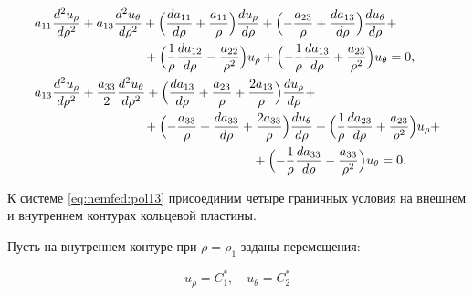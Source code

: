 \begin{equation}

\label{eq:nemfed:pol13}

\begin{aligned}

&a_{11}\dfrac{d^2 u_\rho}{d \rho^2}+a_{13}\dfrac{d^2 u_{\theta}}{d

\rho^2}+\Bigl(\dfrac{d a_{11}}{d \rho}+\dfrac{a_{11}}{\rho} \Bigr)\dfrac{du_{\rho}}{d \rho}+

\Bigl(-\dfrac{a_{23}}{\rho}+\dfrac{d a_{13}}{d\rho} \Bigr)\dfrac{du_\theta}{d \rho}+\\

& \hspace{3cm} +\Bigl(\dfrac{1}{\rho}\dfrac{d a_{12}}{d \rho} -\dfrac{ a_{22}}{\rho^2}\Bigr)u_{\rho}+ \Bigl(-\dfrac{1}{\rho}\dfrac{d a_{13}}{d \rho} +\dfrac{a_{23}}{\rho^2} \Bigr)u_\theta=0,\\

&a_{13}\dfrac{d^2 u_\rho}{d \rho^2}+\dfrac{a_{33}}{2}\dfrac{d^2

u_{\theta}}{d \rho^2}+\Bigl(\dfrac{d a_{13}}{d\rho}+ \dfrac{

a_{23}}{\rho}+\dfrac{2a_{13}}{\rho} \Bigr)\dfrac{du_{\rho}}{d

\rho}+ \\

& \hspace{3cm} +\Bigl(-\dfrac{a_{33}}{\rho}+\dfrac{d

a_{33}}{d\rho}+\dfrac{2a_{33}}{\rho} \Bigr) \dfrac{du_\theta}{d

\rho}+ \Bigl(\dfrac{1}{\rho}\dfrac{d a_{23}}{d\rho}+ \dfrac{

a_{23}}{\rho^2} \Bigr)u_\rho +\\

& \hspace{6cm} +\Bigl(-\dfrac{1}{\rho} \dfrac{d

a_{33}}{d\rho}-\dfrac{a_{33}}{\rho^2} \Bigr)u_\theta=0.

\end{aligned}

\end{equation}

 К системе \eqref{eq:nemfed:pol13} присоединим четыре граничных условия на внешнем и внутреннем контурах кольцевой пластины.

Пусть на внутреннем контуре при $\rho=\rho_1$  заданы перемещения:

\begin{equation}

\label{eq:nem:usl-a}

u_\rho=C_1^*,\quad  u_\theta=C_2^*

\end{equation}

